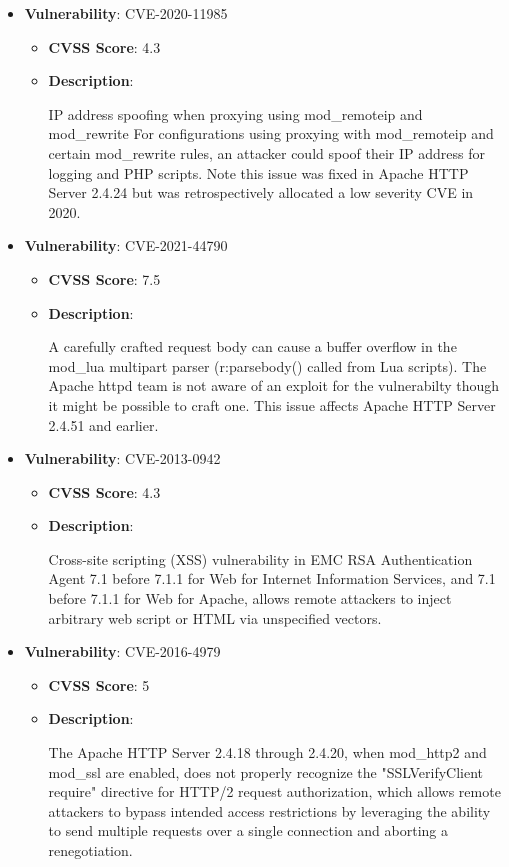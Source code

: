 \documentclass{article}
\begin{document}
\begin{itemize}
        \item \textbf{Vulnerability}: CVE-2020-11985
        \begin{itemize}
            \item \textbf{CVSS Score}:  4.3 
            \item \textbf{Description}:
            \parbox[t]{0.9\linewidth}{
                \ttfamily IP address spoofing when proxying using mod\_remoteip and mod\_rewrite For configurations using proxying with mod\_remoteip and certain mod\_rewrite rules, an attacker could spoof their IP address for logging and PHP scripts. Note this issue was fixed in Apache HTTP Server 2.4.24 but was retrospectively allocated a low severity CVE in 2020.
            }
        \end{itemize}
    
        \item \textbf{Vulnerability}: CVE-2021-44790
        \begin{itemize}
            \item \textbf{CVSS Score}:  7.5 
            \item \textbf{Description}:
            \parbox[t]{0.9\linewidth}{
                \ttfamily A carefully crafted request body can cause a buffer overflow in the mod\_lua multipart parser (r:parsebody() called from Lua scripts). The Apache httpd team is not aware of an exploit for the vulnerabilty though it might be possible to craft one. This issue affects Apache HTTP Server 2.4.51 and earlier.
            }
        \end{itemize}
    
        \item \textbf{Vulnerability}: CVE-2013-0942
        \begin{itemize}
            \item \textbf{CVSS Score}:  4.3 
            \item \textbf{Description}:
            \parbox[t]{0.9\linewidth}{
                \ttfamily Cross-site scripting (XSS) vulnerability in EMC RSA Authentication Agent 7.1 before 7.1.1 for Web for Internet Information Services, and 7.1 before 7.1.1 for Web for Apache, allows remote attackers to inject arbitrary web script or HTML via unspecified vectors.
            }
        \end{itemize}
    
        \item \textbf{Vulnerability}: CVE-2016-4979
        \begin{itemize}
            \item \textbf{CVSS Score}:  5 
            \item \textbf{Description}:
            \parbox[t]{0.9\linewidth}{
                \ttfamily The Apache HTTP Server 2.4.18 through 2.4.20, when mod\_http2 and mod\_ssl are enabled, does not properly recognize the "SSLVerifyClient require" directive for HTTP/2 request authorization, which allows remote attackers to bypass intended access restrictions by leveraging the ability to send multiple requests over a single connection and aborting a renegotiation.
            }
        \end{itemize}
    

\end{itemize}
\end{document}
